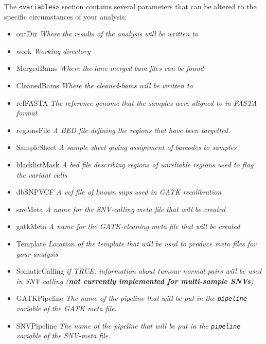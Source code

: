 \documentclass[a4paper,11pt]{article}
\begin{document}
The {\tt <variables>} section contains several parameters that can be altered to the specific circumstances of your analysis;

\begin{itemize}
\item{outDir} {\it Where the results of the analysis will be written to}
\item{work} {\it Working directory}
\item{MergedBams} {\it Where the lane-merged bam files can be found}
\item{CleanedBams} {\it Where the cleaned-bams will be written to}
\item{refFASTA} {\it The reference genome that the samples were aligned to in FASTA format}
\item{regionsFile} {\it A BED file defining the regions that have been targetted.}
\item{SampleSheet} {\it A sample sheet giving assignment of barcodes to samples}
\item{blacklistMask} {\it A bed file describing regions of unreliable regions used to flag the variant calls}
\item{dbSNPVCF} {\it A vcf file of known snps used in GATK recalibration}
\item{snvMeta} {\it A name for the SNV-calling meta file that will be created}
\item{gatkMeta} {\it A name for the GATK-cleaning meta file that will be created}
\item{Template} {\it Location of the template that will be used to produce meta files for your analysis}
\item{SomaticCalling} {\it if TRUE, information about tumour normal pairs will be used in SNV-calling ({\bf not currently implemented for multi-sample SNVs})}
\item{GATKPipeline} {\it The name of the pipeline that will be put in the {\tt pipeline} variable of the GATK meta file. }
\item{SNVPipeline} {\it The name of the pipeline that will be put in the {\tt pipeline} variable of the SNV-meta file. }

\end{itemize}
\end{document}
